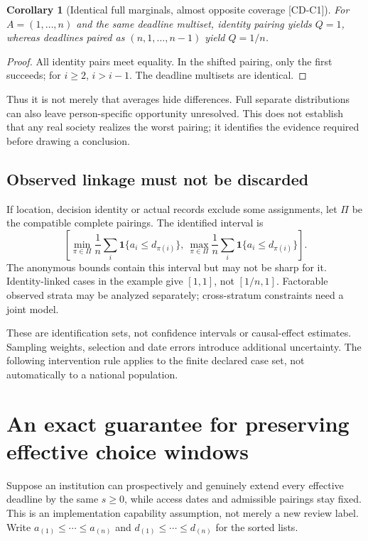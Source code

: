\documentclass[11pt,a4paper]{article}
\newtheorem{corollary}[theorem]{Corollary}
\theoremstyle{definition}\newtheorem{definition}{Definition}
\newcommand{\tagid}[1]{\textnormal{\textsf{[#1]}}}
\newcommand{\ind}{\mathbf 1}\newcommand{\pos}[1]{\left[#1\right]_+}
\begin{document}
\begin{corollary}[Identical full marginals, almost opposite coverage \tagid{CD-C1}]
For $A=(1,\ldots,n)$ and the same deadline multiset, identity pairing yields $Q=1$, whereas deadlines paired as $(n,1,\ldots,n-1)$ yield $Q=1/n$.
\end{corollary}
\begin{proof}
All identity pairs meet equality. In the shifted pairing, only the first succeeds; for $i\ge2$, $i>i-1$. The deadline multisets are identical.
\end{proof}
Thus it is not merely that averages hide differences. Full separate distributions can also leave person-specific opportunity unresolved. This does not establish that any real society realizes the worst pairing; it identifies the evidence required before drawing a conclusion.

\subsection{Observed linkage must not be discarded}
If location, decision identity or actual records exclude some assignments, let $\Pi$ be the compatible complete pairings. The identified interval is
\begin{equation}
\left[\min_{\pi\in\Pi}\frac1n\sum_i\ind\{a_i\le d_{\pi(i)}\},
\ \max_{\pi\in\Pi}\frac1n\sum_i\ind\{a_i\le d_{\pi(i)}\}\right].
\label{eq:restricted}
\end{equation}
The anonymous bounds contain this interval but may not be sharp for it. Identity-linked cases in the example give $[1,1]$, not $[1/n,1]$. Factorable observed strata may be analyzed separately; cross-stratum constraints need a joint model.

These are identification sets, not confidence intervals or causal-effect estimates. Sampling weights, selection and date errors introduce additional uncertainty. The following intervention rule applies to the finite declared case set, not automatically to a national population.

\section{An exact guarantee for preserving effective choice windows}
\label{sec:inverse}
Suppose an institution can prospectively and genuinely extend every effective deadline by the same $s\ge0$, while access dates and admissible pairings stay fixed. This is an implementation capability assumption, not merely a new review label. Write $a_{(1)}\le\cdots\le a_{(n)}$ and $d_{(1)}\le\cdots\le d_{(n)}$ for the sorted lists.
\end{document}
